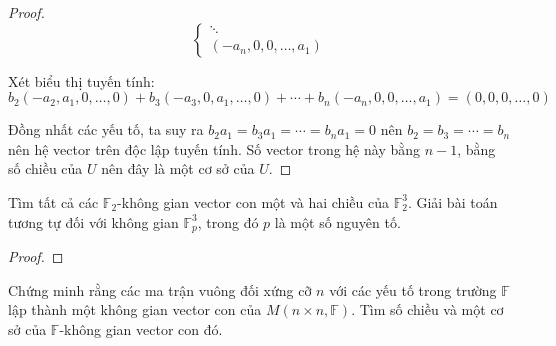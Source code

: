 \documentclass[class=linearalgebra,crop=false]{standalone}
\begin{document}
\begin{proof}
\[\begin{cases}
            \ddots \\
            (-a_{n}, 0, 0, \ldots, a_{1})
        \end{cases}
    \]
    \par Xét biểu thị tuyến tính:
        \[ b_{2}(-a_{2}, a_{1}, 0, \ldots, 0) + b_{3}(-a_{3}, 0, a_{1}, \ldots, 0) + \cdots + b_{n}(-a_{n}, 0, 0, \ldots, a_{1}) = (0,0,0,\ldots, 0) \]
    \par Đồng nhất các yếu tố, ta suy ra $b_{2}a_{1} = b_{3}a_{1} = \cdots = b_{n}a_{1} = 0$ nên $b_{2} = b_{3} = \cdots = b_{n}$ nên hệ vector trên độc lập tuyến tính. Số vector trong hệ này bằng $n - 1$, bằng số chiều của $U$ nên đây là một cơ sở của $U$.
\end{proof}

\begin{exercise}Tìm tất cả các $\mathbb{F}_{2}$-không gian vector con một và hai chiều của $\mathbb{F}^{3}_{2}$. Giải bài toán tương tự đối với không gian $\mathbb{F}^{3}_{p}$, trong đó $p$ là một số nguyên tố.
\end{exercise}

\begin{proof}
\end{proof}

\begin{exercise}Chứng minh rằng các ma trận vuông đối xứng cỡ $n$ với các yếu tố trong trường $\mathbb{F}$ lập thành một không gian vector con của $M(n\times n,\mathbb{F})$. Tìm số chiều và một cơ sở của $\mathbb{F}$-không gian vector con đó.
\end{exercise}
\end{document}
